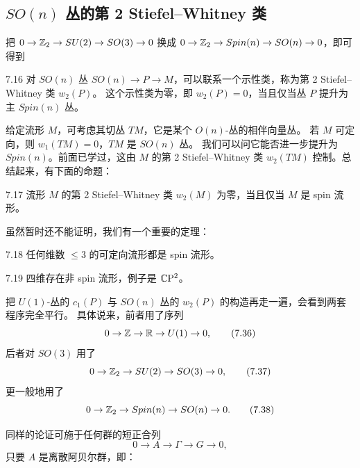 \subsection{$SO(n)$ 丛的第 2 Stiefel--Whitney 类}

把 $0\to\mathbb{Z}_2\to SU(2)\to SO(3)\to 0$ 换成
$0\to\mathbb{Z}_2\to Spin(n)\to SO(n)\to 0$，即可得到

\begin{proposition}{7.16}
对 $SO(n)$ 丛 $SO(n)\to P\to M$，可以联系一个示性类，称为第 2 Stiefel--Whitney 类 $w_2(P)$。
这个示性类为零，即 $w_2(P)=0$，当且仅当丛 $P$ 提升为主 $Spin(n)$ 丛。
\end{proposition}

给定流形 $M$，可考虑其切丛 $TM$，它是某个 $O(n)$-丛的相伴向量丛。
若 $M$ 可定向，则 $w_1(TM)=0$，$TM$ 是 $SO(n)$ 丛。
我们可以问它能否进一步提升为 $Spin(n)$。前面已学过，这由 $M$ 的第 2 Stiefel--Whitney 类
$w_2(TM)$ 控制。总结起来，有下面的命题：

\begin{proposition}{7.17}
流形 $M$ 的第 2 Stiefel--Whitney 类 $w_2(M)$ 为零，当且仅当 $M$ 是 spin 流形。
\end{proposition}

虽然暂时还不能证明，我们有一个重要的定理：

\begin{theorem}{7.18}
任何维数 $\le3$ 的可定向流形都是 spin 流形。
\end{theorem}

\begin{remark}{7.19}
四维存在非 spin 流形，例子是 $\mathbb{C}\mathrm{P}^2$。
\end{remark}

把 $U(1)$-丛的 $c_1(P)$ 与 $SO(n)$ 丛的 $w_2(P)$ 的构造再走一遍，会看到两套程序完全平行。
具体说来，前者用了序列
\begin{equation}
0\to\mathbb{Z}\to\mathbb{R}\to U(1)\to 0,
\tag{7.36}
\end{equation}
后者对 $SO(3)$ 用了
\begin{equation}
0\to\mathbb{Z}_2\to SU(2)\to SO(3)\to 0,
\tag{7.37}
\end{equation}
更一般地用了
\begin{equation}
0\to\mathbb{Z}_2\to Spin(n)\to SO(n)\to 0.
\tag{7.38}
\end{equation}

同样的论证可施于任何群的短正合列
\begin{equation}
0\to A\to\Gamma\to G\to 0,
\tag{7.39}
\end{equation}
只要 $A$ 是离散阿贝尔群，即：

